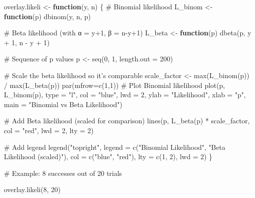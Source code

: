 \documentclass[
  letterpaper,
  DIV=11,
  numbers=noendperiod]{scrreprt}
\newenvironment{Shaded}{\begin{snugshade}}{\end{snugshade}}
\newcommand{\AttributeTok}[1]{\textcolor[rgb]{0.40,0.45,0.13}{#1}}
\newcommand{\CommentTok}[1]{\textcolor[rgb]{0.37,0.37,0.37}{#1}}
\newcommand{\ControlFlowTok}[1]{\textcolor[rgb]{0.00,0.23,0.31}{\textbf{#1}}}
\newcommand{\DecValTok}[1]{\textcolor[rgb]{0.68,0.00,0.00}{#1}}
\newcommand{\FunctionTok}[1]{\textcolor[rgb]{0.28,0.35,0.67}{#1}}
\newcommand{\NormalTok}[1]{\textcolor[rgb]{0.00,0.23,0.31}{#1}}
\newcommand{\OtherTok}[1]{\textcolor[rgb]{0.00,0.23,0.31}{#1}}
\newcommand{\SpecialCharTok}[1]{\textcolor[rgb]{0.37,0.37,0.37}{#1}}
\newcommand{\StringTok}[1]{\textcolor[rgb]{0.13,0.47,0.30}{#1}}
\begin{document}
\begin{Shaded}
\begin{Highlighting}[]
\NormalTok{overlay.likeli }\OtherTok{\textless{}{-}} \ControlFlowTok{function}\NormalTok{(y, n) \{}
  \CommentTok{\# Binomial likelihood}
\NormalTok{  L\_binom }\OtherTok{\textless{}{-}} \ControlFlowTok{function}\NormalTok{(p) }\FunctionTok{dbinom}\NormalTok{(y, n, p)}
  
  \CommentTok{\# Beta likelihood (with α = y+1, β = n{-}y+1)}
\NormalTok{  L\_beta }\OtherTok{\textless{}{-}} \ControlFlowTok{function}\NormalTok{(p) }\FunctionTok{dbeta}\NormalTok{(p, y }\SpecialCharTok{+} \DecValTok{1}\NormalTok{, n }\SpecialCharTok{{-}}\NormalTok{ y }\SpecialCharTok{+} \DecValTok{1}\NormalTok{)}
  
  \CommentTok{\# Sequence of p values}
\NormalTok{  p }\OtherTok{\textless{}{-}} \FunctionTok{seq}\NormalTok{(}\DecValTok{0}\NormalTok{, }\DecValTok{1}\NormalTok{, }\AttributeTok{length.out =} \DecValTok{200}\NormalTok{)}
  
  \CommentTok{\# Scale the beta likelihood so it’s comparable}
\NormalTok{  scale\_factor }\OtherTok{\textless{}{-}} \FunctionTok{max}\NormalTok{(}\FunctionTok{L\_binom}\NormalTok{(p)) }\SpecialCharTok{/} \FunctionTok{max}\NormalTok{(}\FunctionTok{L\_beta}\NormalTok{(p))}
  \FunctionTok{par}\NormalTok{(}\AttributeTok{mfrow=}\FunctionTok{c}\NormalTok{(}\DecValTok{1}\NormalTok{,}\DecValTok{1}\NormalTok{))}
  \CommentTok{\# Plot Binomial likelihood}
  \FunctionTok{plot}\NormalTok{(p, }\FunctionTok{L\_binom}\NormalTok{(p), }\AttributeTok{type =} \StringTok{"l"}\NormalTok{, }\AttributeTok{col =} \StringTok{"blue"}\NormalTok{, }\AttributeTok{lwd =} \DecValTok{2}\NormalTok{,}
       \AttributeTok{ylab =} \StringTok{"Likelihood"}\NormalTok{, }\AttributeTok{xlab =} \StringTok{"p"}\NormalTok{,}
       \AttributeTok{main =} \StringTok{"Binomial vs Beta Likelihood"}\NormalTok{)}
  
  \CommentTok{\# Add Beta likelihood (scaled for comparison)}
  \FunctionTok{lines}\NormalTok{(p, }\FunctionTok{L\_beta}\NormalTok{(p) }\SpecialCharTok{*}\NormalTok{ scale\_factor, }\AttributeTok{col =} \StringTok{"red"}\NormalTok{, }\AttributeTok{lwd =} \DecValTok{2}\NormalTok{, }\AttributeTok{lty =} \DecValTok{2}\NormalTok{)}
  
  \CommentTok{\# Add legend}
  \FunctionTok{legend}\NormalTok{(}\StringTok{"topright"}\NormalTok{,}
         \AttributeTok{legend =} \FunctionTok{c}\NormalTok{(}\StringTok{"Binomial Likelihood"}\NormalTok{, }\StringTok{"Beta Likelihood (scaled)"}\NormalTok{),}
         \AttributeTok{col =} \FunctionTok{c}\NormalTok{(}\StringTok{"blue"}\NormalTok{, }\StringTok{"red"}\NormalTok{),}
         \AttributeTok{lty =} \FunctionTok{c}\NormalTok{(}\DecValTok{1}\NormalTok{, }\DecValTok{2}\NormalTok{), }\AttributeTok{lwd =} \DecValTok{2}\NormalTok{)}
\NormalTok{\}}

\CommentTok{\# Example: 8 successes out of 20 trials}

\FunctionTok{overlay.likeli}\NormalTok{(}\DecValTok{8}\NormalTok{, }\DecValTok{20}\NormalTok{)}
\end{Highlighting}
\end{Shaded}
\end{document}

